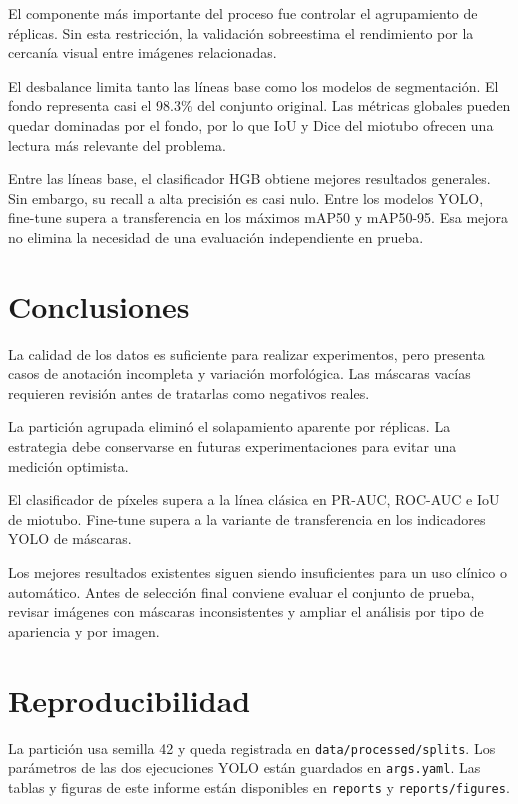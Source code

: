 \documentclass[11pt,a4paper]{article}
\begin{document}
El componente más importante del proceso fue controlar el agrupamiento de réplicas. Sin esta restricción, la validación sobreestima el rendimiento por la cercanía visual entre imágenes relacionadas.

El desbalance limita tanto las líneas base como los modelos de segmentación. El fondo representa casi el 98.3\% del conjunto original. Las métricas globales pueden quedar dominadas por el fondo, por lo que IoU y Dice del miotubo ofrecen una lectura más relevante del problema.

Entre las líneas base, el clasificador HGB obtiene mejores resultados generales. Sin embargo, su recall a alta precisión es casi nulo. Entre los modelos YOLO, fine-tune supera a transferencia en los máximos mAP50 y mAP50-95. Esa mejora no elimina la necesidad de una evaluación independiente en prueba.

\section{Conclusiones}

La calidad de los datos es suficiente para realizar experimentos, pero presenta casos de anotación incompleta y variación morfológica. Las máscaras vacías requieren revisión antes de tratarlas como negativos reales.

La partición agrupada eliminó el solapamiento aparente por réplicas. La estrategia debe conservarse en futuras experimentaciones para evitar una medición optimista.

El clasificador de píxeles supera a la línea clásica en PR-AUC, ROC-AUC e IoU de miotubo. Fine-tune supera a la variante de transferencia en los indicadores YOLO de máscaras.

Los mejores resultados existentes siguen siendo insuficientes para un uso clínico o automático. Antes de selección final conviene evaluar el conjunto de prueba, revisar imágenes con máscaras inconsistentes y ampliar el análisis por tipo de apariencia y por imagen.

\section{Reproducibilidad}

La partición usa semilla 42 y queda registrada en \texttt{data/processed/splits}. Los parámetros de las dos ejecuciones YOLO están guardados en \texttt{args.yaml}. Las tablas y figuras de este informe están disponibles en \texttt{reports} y \texttt{reports/figures}.
\end{document}
